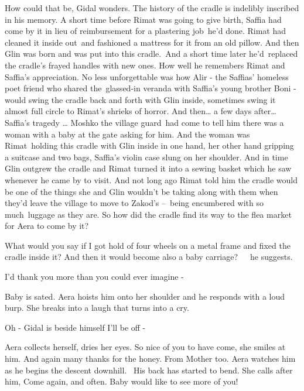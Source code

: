 \documentclass[letterpaper]{article}
\begin{document}
How could that be, Gidal wonders. The history of the cradle is indelibly inscribed in his memory. A short time before
Rimat was going to give birth, Saffia had come by it in lieu of reimbursement for a plastering
job\textcolor[rgb]{0.0,0.4392157,0.7529412}{\ }he'd done. Rimat had cleaned it inside out~and fashioned a mattress for
it from an old pillow. And then Glin was born and was put into this cradle.\ And a short time later he{}'d\ replaced
the cradle's frayed handles with new ones. How well he remembers Rimat and Saffia's appreciation. No less unforgettable
was how Alir - the Saffias' homeless poet friend who shared the\ glassed-in veranda with Saffia's young brother Boni -
would swing the cradle back and forth with Glin inside, sometimes swing it almost full circle to Rimat's shrieks of
horror. And then{\dots} a few days after{\dots} Saffia's tragedy {\dots} Moshko the village guard~had come to tell him
there was a woman with a baby at the gate asking for him. And the woman was Rimat~holding this cradle with Glin inside
in one hand, her other hand gripping a suitcase and two bags, Saffia's violin case slung on her shoulder. And in time
Glin outgrew the cradle and Rimat turned it into a sewing basket which he saw whenever he came by to visit. And not
long ago Rimat told him the cradle would be one of the things she and Glin wouldn{}'t be taking along with them when
they{}'d leave the village to move to Zakod's \textcolor[rgb]{0.0,0.4392157,0.7529412}{{}--}\ being encumbered with so
much\ luggage as they are. So how did the cradle find its way to the flea market for Aera to come by it?

{\textquotedbl}What would you say if I got hold of four wheels on a metal frame and fixed the cradle inside it? And then
it would become also a baby carriage?{\textquotedbl}\ \ \ he suggests.

{\textquotedbl}I'd thank you more than you could ever imagine -{\textquotedbl} 

Baby is sated. Aera hoists him onto her shoulder and he responds with a loud burp. She breaks into a laugh that turns
into a cry. 

{\textquotedbl}Oh -{\textquotedbl} Gidal is beside himself {\textquotedbl}I'll be off -{\textquotedbl}

Aera collects herself, dries her eyes. {\textquotedbl}So nice of you to have come,{\textquotedbl} she smiles at him.
{\textquotedbl}And again many thanks for the honey. From Mother too.{\textquotedbl} Aera watches him as he begins the
descent downhill. \ His back has started to bend. She calls after him, {\textquotedbl}Come again, and often. Baby would
like to see more of you!{\textquotedbl}
\end{document}
